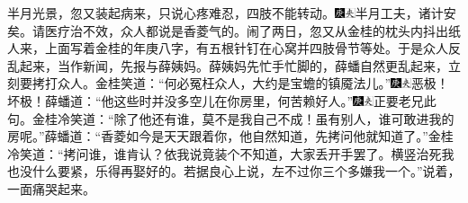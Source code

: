 半月光景，忽又装起病来，只说心疼难忍，四肢不能转动。{\includegraphics[width=3mm]{../Images/00004}\includegraphics[width=3mm]{../Images/00012}\footnotesize \kaishu 半月工夫，诸计安矣。}请医疗治不效，众人都说是香菱气的。闹了两日，忽又从金桂的枕头内抖出纸人来，上面写着金桂的年庚八字，有五根针钉在心窝并四肢骨节等处。于是众人反乱起来，当作新闻，先报与薛姨妈。薛姨妈先忙手忙脚的，薛蟠自然更乱起来，立刻要拷打众人。金桂笑道：``何必冤枉众人，大约是宝蟾的镇魇法儿。''{\includegraphics[width=3mm]{../Images/00004}\includegraphics[width=3mm]{../Images/00012}\footnotesize \kaishu 恶极！坏极！}薛蟠道：``他这些时并没多空儿在你房里，何苦赖好人。''{\includegraphics[width=3mm]{../Images/00004}\includegraphics[width=3mm]{../Images/00012}\footnotesize \kaishu 正要老兄此句。}金桂冷笑道：``除了他还有谁，莫不是我自己不成！虽有别人，谁可敢进我的房呢。''薛蟠道：``香菱如今是天天跟着你，他自然知道，先拷问他就知道了。''金桂冷笑道：``拷问谁，谁肯认？依我说竟装个不知道，大家丢开手罢了。横竖治死我也没什么要紧，乐得再娶好的。若据良心上说，左不过你三个多嫌我一个。''说着，一面痛哭起来。

